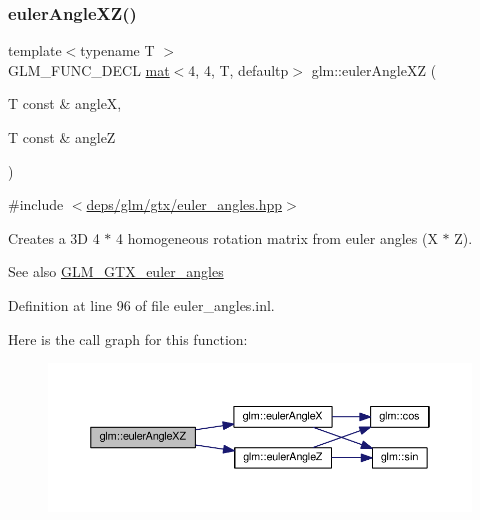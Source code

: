 \subsubsection{\texorpdfstring{euler\+Angle\+X\+Z()}{eulerAngleXZ()}}
{\footnotesize\ttfamily template$<$typename T $>$ \\
G\+L\+M\+\_\+\+F\+U\+N\+C\+\_\+\+D\+E\+CL \hyperlink{structglm_1_1mat}{mat}$<$4, 4, T, defaultp$>$ glm\+::euler\+Angle\+XZ (\begin{DoxyParamCaption}\item[{T const \&}]{angleX,  }\item[{T const \&}]{angleZ }\end{DoxyParamCaption})}



{\ttfamily \#include $<$\hyperlink{euler__angles_8hpp}{deps/glm/gtx/euler\+\_\+angles.\+hpp}$>$}

Creates a 3D 4 $\ast$ 4 homogeneous rotation matrix from euler angles (X $\ast$ Z). \begin{DoxySeeAlso}{See also}
\hyperlink{group__gtx__euler__angles}{G\+L\+M\+\_\+\+G\+T\+X\+\_\+euler\+\_\+angles} 
\end{DoxySeeAlso}


Definition at line 96 of file euler\+\_\+angles.\+inl.

Here is the call graph for this function\+:
\nopagebreak
\begin{figure}[H]
\begin{center}
\leavevmode
\includegraphics[width=350pt]{d2/d7e/group__gtx__euler__angles_gaa39bd323c65c2fc0a1508be33a237ce9_cgraph}
\end{center}
\end{figure}
\mbox{\label{group__gtx__euler__angles_gab84bf4746805fd69b8ecbb230e3974c5}} 
